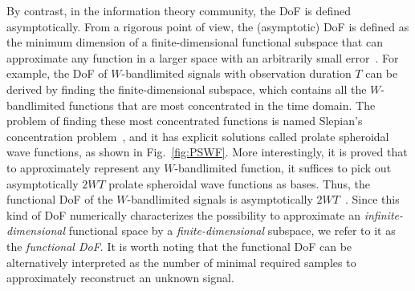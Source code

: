 \documentclass[journal,twocolumn]{IEEEtran}
\begin{document}
By contrast, in the information theory community, the DoF is defined asymptotically. From a rigorous point of view, the (asymptotic) DoF is defined as the minimum dimension of a finite-dimensional functional subspace that can approximate any function in a larger space with an arbitrarily small error~\cite{poon2005degrees}. For example, the DoF of $W$-bandlimited signals with observation duration $T$ can be derived by finding the finite-dimensional subspace, which contains all the $W$-bandlimited functions that are most concentrated in the time domain. The problem of finding these most concentrated functions is named Slepian's concentration problem~\cite{slepian1976bandwidth}, and it has explicit solutions called prolate spheroidal wave functions, as shown in Fig.~\ref{fig:PSWF}.
More interestingly, it is proved that to approximately represent any $W$-bandlimited function, it suffices to pick out asymptotically $2WT$ prolate spheroidal wave functions as bases. Thus, the functional DoF of the $W$-bandlimited signals is asymptotically $2WT$~\cite{slepian1976bandwidth}. 
Since this kind of DoF numerically characterizes the possibility to approximate an {\emph{infinite-dimensional}} functional space by a {\emph{finite-dimensional}} subspace, we refer to it as the {{\emph{functional DoF}}}. 
It is worth noting that the functional DoF can be alternatively interpreted as the number of minimal required samples to approximately reconstruct an unknown signal. 




\end{document}
